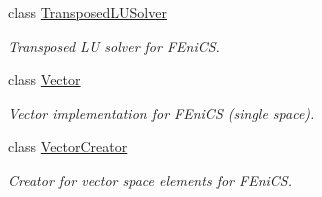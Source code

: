 \begin{DoxyCompactItemize}
class \hyperlink{classSpacy_1_1FEniCS_1_1TransposedLUSolver}{Transposed\+L\+U\+Solver}
\begin{DoxyCompactList}\small\item\em Transposed LU solver for F\+Eni\+CS. \end{DoxyCompactList}\item 
class \hyperlink{classSpacy_1_1FEniCS_1_1Vector}{Vector}
\begin{DoxyCompactList}\small\item\em Vector implementation for F\+Eni\+CS (single space). \end{DoxyCompactList}\item 
class \hyperlink{classSpacy_1_1FEniCS_1_1VectorCreator}{Vector\+Creator}
\begin{DoxyCompactList}\small\item\em Creator for vector space elements for F\+Eni\+CS. \end{DoxyCompactList}\end{DoxyCompactItemize}
